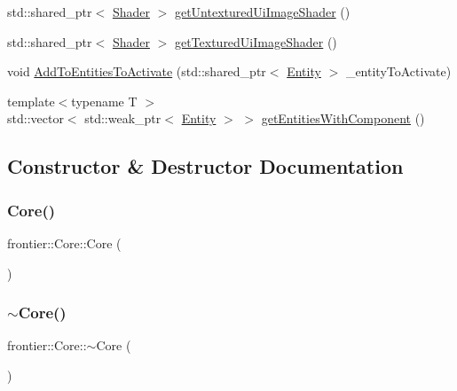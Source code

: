 \begin{DoxyCompactItemize}
std\+::shared\+\_\+ptr$<$ \hyperlink{classfrontier_1_1_shader}{Shader} $>$ \hyperlink{classfrontier_1_1_core_a6b61c169b75acd9a15bf3009bc838901}{get\+Untextured\+Ui\+Image\+Shader} ()
\item 
std\+::shared\+\_\+ptr$<$ \hyperlink{classfrontier_1_1_shader}{Shader} $>$ \hyperlink{classfrontier_1_1_core_aac07a29176bd8056e004f7be8c919d3f}{get\+Textured\+Ui\+Image\+Shader} ()
\item 
void \hyperlink{classfrontier_1_1_core_a0d510b25cca36dddb10b562913ae24c7}{Add\+To\+Entities\+To\+Activate} (std\+::shared\+\_\+ptr$<$ \hyperlink{classfrontier_1_1_entity}{Entity} $>$ \+\_\+entity\+To\+Activate)
\item 
{\footnotesize template$<$typename T $>$ }\\std\+::vector$<$ std\+::weak\+\_\+ptr$<$ \hyperlink{classfrontier_1_1_entity}{Entity} $>$ $>$ \hyperlink{classfrontier_1_1_core_a8c42c287ec4a96ff3be194f92e82c367}{get\+Entities\+With\+Component} ()
\end{DoxyCompactItemize}


\subsection{Constructor \& Destructor Documentation}
\mbox{\label{classfrontier_1_1_core_ad4bfe6cd519ba43996f9881598d63e50}} 
\subsubsection{\texorpdfstring{Core()}{Core()}}
{\footnotesize\ttfamily frontier\+::\+Core\+::\+Core (\begin{DoxyParamCaption}{ }\end{DoxyParamCaption})}

\mbox{\label{classfrontier_1_1_core_a4d5ae078d34758c54c517bede518e2e4}} 
\subsubsection{\texorpdfstring{$\sim$\+Core()}{~Core()}}
{\footnotesize\ttfamily frontier\+::\+Core\+::$\sim$\+Core (\begin{DoxyParamCaption}{ }\end{DoxyParamCaption})}



